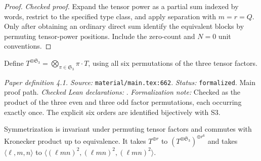 \begin{proof}
\leanok
{}
\textit{Checked proof.} Expand the tensor power as a partial sum indexed by words, restrict to the specified type class, and apply separation with $m=r=Q$. Only after obtaining an ordinary direct sum identify the equivalent blocks by permuting tensor-power positions. Include the zero-count and $N=0$ unit conventions.
\end{proof}

\renewcommand{\thetheorem}{4.1}
\begin{definition}
\label{def:symmetrization}
\leanok
{}
Define $T^{\otimes\mathfrak S_3}=\bigotimes_{\pi\in\mathfrak S_3}\pi\cdot T$, using all six permutations of the three tensor factors.
\end{definition}

\noindent\textit{Paper definition 4.1. Source:} \texttt{material/main.tex:662}.
\textit{Status:} \texttt{formalized}. Main proof path.
\textit{Checked Lean declarations:} .
\textit{Formalization note:} Checked as the product of the three even and three odd factor permutations, each occurring exactly once. The explicit six orders are identified bijectively with S3.

\renewcommand{\thetheorem}{4.2}
\begin{lemma}
\label{lem:sym-properties}
\manuscriptproof
{}
\leanok
{}
Symmetrization is invariant under permuting tensor factors and commutes with Kronecker product up to equivalence. It takes $T^{\oplus r}$ to $(T^{\otimes\mathfrak S_3})^{\oplus r^6}$ and takes $\langle\ell,m,n\rangle$ to $\langle(\ell mn)^2,(\ell mn)^2,(\ell mn)^2\rangle$.
\end{lemma}

